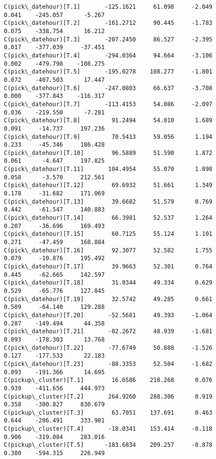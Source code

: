 \documentclass[11pt]{article}
\begin{document}
\begin{Verbatim}[commandchars=\\\{\}]
C(pick\_datehour)[T.1]       -125.1621     61.098     -2.049      0.041    -245.057      -5.267
C(pick\_datehour)[T.2]       -161.2712     90.445     -1.783      0.075    -338.754      16.212
C(pick\_datehour)[T.3]       -207.2450     86.527     -2.395      0.017    -377.039     -37.451
C(pick\_datehour)[T.4]       -294.0364     94.664     -3.106      0.002    -479.798    -108.275
C(pick\_datehour)[T.5]       -195.0278    108.277     -1.801      0.072    -407.503      17.447
C(pick\_datehour)[T.6]       -247.0803     66.637     -3.708      0.000    -377.843    -116.317
C(pick\_datehour)[T.7]       -113.4153     54.086     -2.097      0.036    -219.550      -7.281
C(pick\_datehour)[T.8]         91.2494     54.010      1.689      0.091     -14.737     197.236
C(pick\_datehour)[T.9]         70.5413     59.056      1.194      0.233     -45.346     186.428
C(pick\_datehour)[T.10]        96.5889     51.590      1.872      0.061      -4.647     197.825
C(pick\_datehour)[T.11]       104.4954     55.070      1.898      0.058      -3.570     212.561
C(pick\_datehour)[T.12]        69.6932     51.661      1.349      0.178     -31.682     171.069
C(pick\_datehour)[T.13]        39.6682     51.579      0.769      0.442     -61.547     140.883
C(pick\_datehour)[T.14]        66.3981     52.537      1.264      0.207     -36.696     169.493
C(pick\_datehour)[T.15]        60.7125     55.124      1.101      0.271     -47.459     168.884
C(pick\_datehour)[T.16]        92.3077     52.582      1.755      0.079     -10.876     195.492
C(pick\_datehour)[T.17]        39.9663     52.301      0.764      0.445     -62.665     142.597
C(pick\_datehour)[T.18]        31.0344     49.334      0.629      0.529     -65.776     127.845
C(pick\_datehour)[T.19]        32.5742     49.285      0.661      0.509     -64.140     129.288
C(pick\_datehour)[T.20]       -52.5681     49.393     -1.064      0.287    -149.494      44.358
C(pick\_datehour)[T.21]       -82.2672     48.939     -1.681      0.093    -178.303      13.768
C(pick\_datehour)[T.22]       -77.6749     50.888     -1.526      0.127    -177.533      22.183
C(pick\_datehour)[T.23]       -88.3353     52.504     -1.682      0.093    -191.366      14.695
C(pickup\_cluster)[T.1]        16.6586    218.268      0.076      0.939    -411.656     444.973
C(pickup\_cluster)[T.2]       264.9260    288.306      0.919      0.358    -300.827     830.679
C(pickup\_cluster)[T.3]        63.7051    137.691      0.463      0.644    -206.491     333.901
C(pickup\_cluster)[T.4]       -18.0341    153.414     -0.118      0.906    -319.084     283.016
C(pickup\_cluster)[T.5]      -183.6834    209.257     -0.878      0.380    -594.315     226.949

\end{Verbatim}
\end{document}
